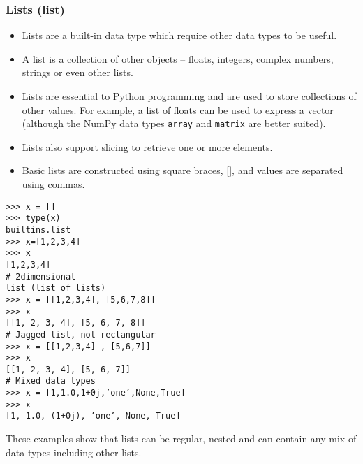 \documentclass[KSmain.tex]{subfiles}
\begin{document}
\subsubsection{Lists (list)}
\begin{itemize}
\item Lists are a built-in data type which require other data types to be useful. 
\item A list is a collection of other objects
– floats, integers, complex numbers, strings or even other lists. 
\item Lists are essential to Python programming
and are used to store collections of other values. For example, a list of floats can be used to express a vector
(although the NumPy data types \texttt{array} and \texttt{matrix} are better suited). 
\item Lists also support slicing to retrieve
one or more elements. 
\item Basic lists are constructed using square braces, [], and values are separated using
commas.
\end{itemize}
\begin{framed}
\begin{verbatim}
>>> x = []
>>> type(x)
builtins.list
>>> x=[1,2,3,4]
>>> x
[1,2,3,4]
# 2dimensional
list (list of lists)
>>> x = [[1,2,3,4], [5,6,7,8]]
>>> x
[[1, 2, 3, 4], [5, 6, 7, 8]]
# Jagged list, not rectangular
>>> x = [[1,2,3,4] , [5,6,7]]
>>> x
[[1, 2, 3, 4], [5, 6, 7]]
# Mixed data types
>>> x = [1,1.0,1+0j,’one’,None,True]
>>> x
[1, 1.0, (1+0j), ’one’, None, True]
\end{verbatim}
\end{framed}
These examples show that lists can be regular, nested and can contain any mix of data types including
other lists.
\end{document}
